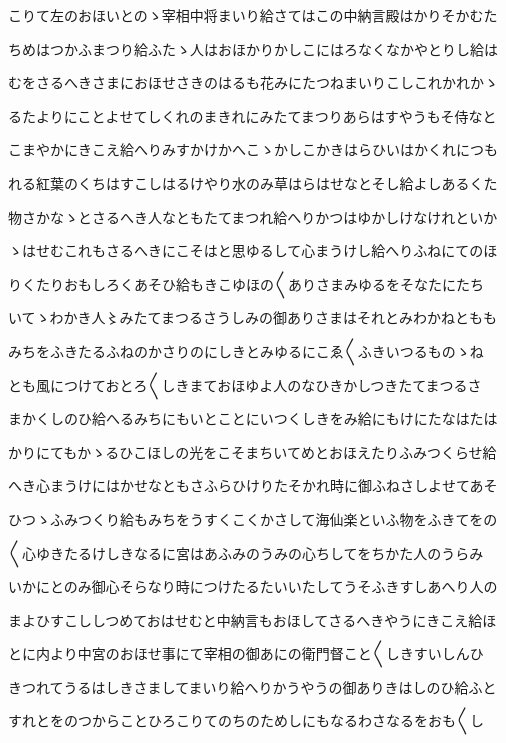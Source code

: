 \documentclass[a4paper,11pt,landscape]{ltjtarticle}
\begin{document}
こりて左のおほいとのゝ宰相中将まいり給さてはこの中納言殿はかりそかむた
\par\medskip
ちめはつかふまつり給ふたゝ人はおほかりかしこにはろなくなかやとりし給は
\par\medskip
むをさるへきさまにおほせさきのはるも花みにたつねまいりこしこれかれかゝ
\par\medskip
るたよりにことよせてしくれのまきれにみたてまつりあらはすやうもそ侍なと
\par\medskip
こまやかにきこえ給へりみすかけかへこゝかしこかきはらひいはかくれにつも
\par\medskip
れる紅葉のくちはすこしはるけやり水のみ草はらはせなとそし給よしあるくた
\par\medskip
物さかなゝとさるへき人なともたてまつれ給へりかつはゆかしけなけれといか
\par\medskip
ゝはせむこれもさるへきにこそはと思ゆるして心まうけし給へりふねにてのほ
\par\medskip
りくたりおもしろくあそひ給もきこゆほの〱ありさまみゆるをそなたにたち
\par\medskip
いてゝわかき人〻みたてまつるさうしみの御ありさまはそれとみわかねともも
\par\medskip
みちをふきたるふねのかさりのにしきとみゆるにこゑ〱ふきいつるものゝね
\par\medskip
とも風につけておとろ〱しきまておほゆよ人のなひきかしつきたてまつるさ
\par\medskip
まかくしのひ給へるみちにもいとことにいつくしきをみ給にもけにたなはたは
\par\medskip
かりにてもかゝるひこほしの光をこそまちいてめとおほえたりふみつくらせ給
\par\medskip
へき心まうけにはかせなともさふらひけりたそかれ時に御ふねさしよせてあそ
\par\medskip
ひつゝふみつくり給もみちをうすくこくかさして海仙楽といふ物をふきてをの
\par\medskip
〱心ゆきたるけしきなるに宮はあふみのうみの心ちしてをちかた人のうらみ
\par\medskip
いかにとのみ御心そらなり時につけたるたいいたしてうそふきすしあへり人の
\par\medskip
まよひすこししつめておはせむと中納言もおほしてさるへきやうにきこえ給ほ
\par\medskip
とに内より中宮のおほせ事にて宰相の御あにの衛門督こと〱しきすいしんひ
\par\medskip
きつれてうるはしきさましてまいり給へりかうやうの御ありきはしのひ給ふと
\par\medskip
すれとをのつからことひろこりてのちのためしにもなるわさなるをおも〱し
\end{document}
